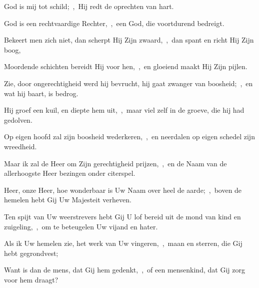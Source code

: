 \documentclass[12pt,twoside,a5paper]{article}
\begin{document}
\begin{halfparskip}
  God is mij tot schild;~\sep\ Hij redt de oprechten van hart.

  God is een rechtvaardige Rechter,~\sep\ een God, die voortdurend bedreigt.

  Bekeert men zich niet, dan scherpt Hij Zijn zwaard,~\sep\ dan spant en richt Hij Zijn boog,

  Moordende schichten bereidt Hij voor hen,~\sep\ en gloeiend maakt Hij Zijn pijlen.

  Zie, door ongerechtigheid werd hij bevrucht, hij gaat zwanger van boosheid;~\sep\ en wat hij baart, is bedrog.

  Hij groef een kuil, en diepte hem uit,~\sep\ maar viel zelf in de groeve, die hij had gedolven.

  Op eigen hoofd zal zijn boosheid wederkeren,~\sep\ en neerdalen op eigen schedel zijn wreedheid.

  Maar ik zal de Heer om Zijn gerechtigheid prijzen,~\sep\ en de Naam van de allerhoogste Heer bezingen onder citerspel.
\end{halfparskip}





\begin{halfparskip}
  Heer, onze Heer, hoe wonderbaar is Uw Naam over heel de aarde;~\sep\ boven de hemelen hebt Gij Uw Majesteit verheven.


  Ten spijt van Uw weerstrevers hebt Gij U lof bereid uit de mond van kind en zuigeling,~\sep\ om te beteugelen Uw vijand en hater.

  Als ik Uw hemelen zie, het werk van Uw vingeren,~\sep\ maan en sterren, die Gij hebt gegrondvest;

  Want is dan de mens, dat Gij hem gedenkt,~\sep\ of een mensenkind, dat Gij zorg voor hem draagt?
\end{halfparskip}

\end{document}
